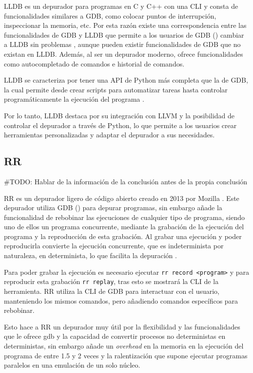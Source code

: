 LLDB es un \gls{depurador} para programas en C y C++ con una \gls{CLI} y consta de funcionalidades similares a GDB, como colocar puntos de interrupción, inspeccionar la memoria, etc. Por esta razón existe una correspondencia entre las funcionalidades de GDB y LLDB que permite a los usuarios de GDB () cambiar a LLDB sin problemas \cite{LLDB}, aunque pueden existir funcionalidades de GDB que no existan en LLDB. Además, al ser un \gls{depurador} moderno, ofrece funcionalidades como autocompletado de comandos e historial de comandos.

LLDB se caracteriza por tener una \gls{API} de Python más completa que la de GDB, la cual permite desde crear \glspl{script} para automatizar tareas hasta controlar programáticamente la ejecución del programa \cite{LLDBPython}. 

Por lo tanto, LLDB destaca por su integración con LLVM y la posibilidad de controlar el depurador a través de Python, lo que permite a los usuarios crear herramientas personalizadas y adaptar el \gls{depurador} a sus necesidades.

\subsection{RR}{\label{subsec:rr}}

#TODO: Hablar de la información de la conclusión antes de la propia conclusión

RR es un \gls{depurador} ligero de código abierto creado en 2013 por Mozilla \cite{RRWiki}. Este depurador utiliza GDB () para depurar programas, sin embargo añade la funcionalidad de rebobinar las ejecuciones de cualquier tipo de programa, siendo uno de ellos un \gls{programa concurrente}, mediante la grabación de la ejecución del programa y la reproducción de esta grabación. Al grabar una ejecución y poder reproducirla convierte la ejecución concurrente, que es indeterminista por naturaleza, en determinista, lo que facilita la depuración \cite{RR}.

Para poder grabar la ejecución es necesario ejecutar \texttt{rr record <program>} y para reproducir esta grabación \texttt{rr replay}, tras esto se mostrará la CLI de la herramienta. RR utiliza la CLI de GDB para interactuar con el usuario, manteniendo los mismos comandos, pero añadiendo comandos específicos para rebobinar.

Esto hace a RR un depurador muy útil por la flexibilidad y las funcionalidades que le ofrece gdb y la capacidad de convertir procesos no deterministas en deterministas, sin embargo añade un \textit{\gls{overhead}} en la memoria en la ejecución del programa de entre 1.5 y 2 veces y la ralentización que supone ejecutar programas paralelos en una emulación de un solo núcleo\cite{RR}.

